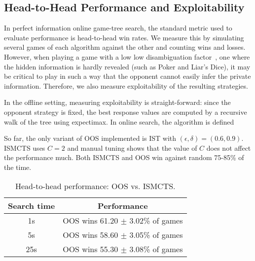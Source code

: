 \documentclass[letterpaper]{article}
\newcounter{mlNoteCounter}
\newcommand{\mlnote}[1]{{\scriptsize \color{darkgreen} $\blacksquare$ \refstepcounter{mlNoteCounter}\textsf{[ML]$_{\arabic{mlNoteCounter}}$:{#1}}}}
\begin{document}
\subsection{Head-to-Head Performance and Exploitability} 


In perfect information online game-tree search, the standard metric used to evaluate performance 
is head-to-head win rates. We measure this by simulating several games of each algorithm against the other
and counting wins and losses. 
However, when playing a game with a low low disambiguation 
factor~\cite{Long10Understanding}, one where the hidden information is hardly revealed (such as Poker and Liar's Dice), 
it may be critical to play in such a way that the opponent cannot easily infer the private information. Therefore, 
we also measure exploitability of the resulting strategies. 

In the offline setting, measuring exploitability is straight-forward: since the opponent strategy is fixed, the best 
response values are computed by a recursive walk of the tree using expectimax. In online search, the algorithm 
is defined 

So far, the only variant of OOS implemented is IST with $(\epsilon, \delta) = (0.6, 0.9)$. 
ISMCTS uses $C = 2$ and manual tuning shows that the value of $C$ does not 
affect the performance much. Both ISMCTS and OOS win against random 75-85\% of the time.

\begin{table}[h!]
\begin{center}
\begin{tabular}{|c|c|}
\hline
Search time & Performance \\
\hline
    1s      & OOS wins 61.20 $\pm$ 3.02\% of games \\
    5s      & OOS wins 58.60 $\pm$ 3.05\% of games \\
    25s     & OOS wins 55.30 $\pm$ 3.08\% of games \\
\hline
\end{tabular}
\caption{Head-to-head performance: OOS vs. ISMCTS.}
\end{center}
\end{table}
\end{document}
